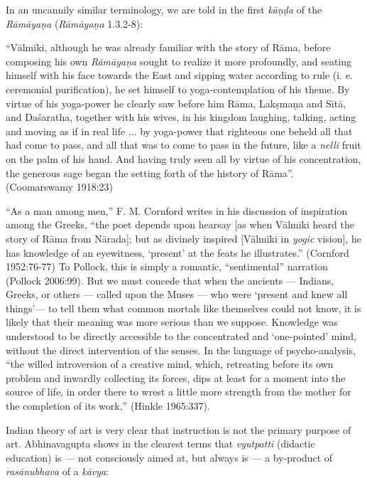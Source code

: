 In an uncannily similar terminology, we are told in the first {\sl kāṇḍa} of the {\sl Rāmāyaṇa} ({\sl Rāmāyaṇa} 1.3.2-8):

\begin{myquote}
“Vālmīki, although he was already familiar with the story of Rāma, before composing his own {\sl Rāmāyaṇa} sought to realize it more profoundly, and seating himself with his face towards the East and sipping water according to rule (i. e. ceremonial purification), he set himself to yoga-contemplation of his theme. By virtue of his yoga-power he clearly saw before him Rāma, Lakṣmaṇa and Sītā, and Daśaratha, together with his wives, in his kingdom laughing, talking, acting and moving as if in real life ... by yoga-power that righteous one beheld all that had come to pass, and all that was to come to pass in the future, like a {\sl nelli} fruit on the palm of his hand. And having truly seen all by virtue of his concentration, the generous sage began the setting forth of the history of Rāma”.   
\hfill (Coomarswamy 1918:23)
\end{myquote}

“As a man among men,” F. M. Cornford writes in his discussion of inspiration among the Greeks, “the poet depends upon hearsay [as when Vālmīki heard the story of Rāma from Nārada]; but as divinely inspired [Vālmīki in {\sl yogic} vision], he has knowledge of an eyewitness, ‘present’ at the feats he illustrates.” (Cornford 1952:76-77) To Pollock, this is simply a romantic, “sentimental” narration (Pollock 2006:99). But we must concede that when the ancients — Indians, Greeks, or others — called upon the Muses — who were ‘present and knew all things’— to tell them what common mortals like themselves could not know, it is likely that their meaning was more serious than we suppose. Knowledge was understood to be directly accessible to the concentrated and ‘one-pointed’ mind, without the direct intervention of the senses. In the language of psycho-analysis,  “the willed introversion of a creative mind, which, retreating before its own problem and inwardly collecting its forces, dips at least for a moment into the source of life, in order there to wrest a little more strength from the mother for the completion of its work,” (Hinkle 1965:337). 

Indian theory of art is very clear that instruction is not the primary purpose of art. Abhinavagupta shows in the clearest terms that {\sl vyutpatti} (didactic education) is — not consciously aimed at, but always is — a by-product of {\sl rasānubhava} of a {\sl kāvya}:



